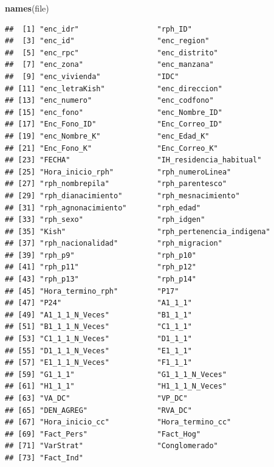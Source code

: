\documentclass[]{book}
\newenvironment{Shaded}{\begin{snugshade}}{\end{snugshade}}
\newcommand{\KeywordTok}[1]{\textcolor[rgb]{0.13,0.29,0.53}{\textbf{#1}}}
\newcommand{\NormalTok}[1]{#1}
\theoremstyle{definition}
\theoremstyle{definition}
\theoremstyle{definition}
\theoremstyle{definition}
\theoremstyle{remark}
\begin{document}
\begin{Shaded}
\begin{Highlighting}[]
\KeywordTok{names}\NormalTok{(file)}
\end{Highlighting}
\end{Shaded}

\begin{verbatim}
##  [1] "enc_idr"                  "rph_ID"                  
##  [3] "enc_id"                   "enc_region"              
##  [5] "enc_rpc"                  "enc_distrito"            
##  [7] "enc_zona"                 "enc_manzana"             
##  [9] "enc_vivienda"             "IDC"                     
## [11] "enc_letraKish"            "enc_direccion"           
## [13] "enc_numero"               "enc_codfono"             
## [15] "enc_fono"                 "enc_Nombre_ID"           
## [17] "Enc_Fono_ID"              "Enc_Correo_ID"           
## [19] "enc_Nombre_K"             "enc_Edad_K"              
## [21] "Enc_Fono_K"               "Enc_Correo_K"            
## [23] "FECHA"                    "IH_residencia_habitual"  
## [25] "Hora_inicio_rph"          "rph_numeroLinea"         
## [27] "rph_nombrepila"           "rph_parentesco"          
## [29] "rph_dianacimiento"        "rph_mesnacimiento"       
## [31] "rph_agnonacimiento"       "rph_edad"                
## [33] "rph_sexo"                 "rph_idgen"               
## [35] "Kish"                     "rph_pertenencia_indigena"
## [37] "rph_nacionalidad"         "rph_migracion"           
## [39] "rph_p9"                   "rph_p10"                 
## [41] "rph_p11"                  "rph_p12"                 
## [43] "rph_p13"                  "rph_p14"                 
## [45] "Hora_termino_rph"         "P17"                     
## [47] "P24"                      "A1_1_1"                  
## [49] "A1_1_1_N_Veces"           "B1_1_1"                  
## [51] "B1_1_1_N_Veces"           "C1_1_1"                  
## [53] "C1_1_1_N_Veces"           "D1_1_1"                  
## [55] "D1_1_1_N_Veces"           "E1_1_1"                  
## [57] "E1_1_1_N_Veces"           "F1_1_1"                  
## [59] "G1_1_1"                   "G1_1_1_N_Veces"          
## [61] "H1_1_1"                   "H1_1_1_N_Veces"          
## [63] "VA_DC"                    "VP_DC"                   
## [65] "DEN_AGREG"                "RVA_DC"                  
## [67] "Hora_inicio_cc"           "Hora_termino_cc"         
## [69] "Fact_Pers"                "Fact_Hog"                
## [71] "VarStrat"                 "Conglomerado"            
## [73] "Fact_Ind"
\end{verbatim}
\end{document}
